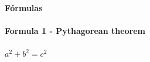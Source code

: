 \documentclass[idxtotoc,hyperref,openany]{labbook} %
\begin{document}

\newpage

\huge \textbf{Fórmulas} \\ \\

\normalsize \textbf{Formula 1 - Pythagorean theorem}\\ \\
$a^2 + b^2 = c^2$\\ \\






\end{document}
